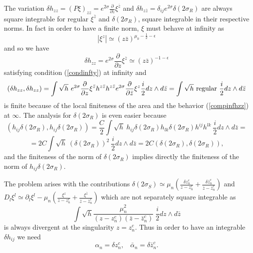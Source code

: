 \documentclass[a4paper,12pt]{article}
\begin{document}
The variation $\delta 
h_{zz}=(P\xi)_{zz}=e^{2\sigma}\frac{\partial}{\partial z}
 \xi^{\bar
z}$ and $\delta h_{z\bar z} = \delta_{ij}
e^{2\sigma}\delta(2\sigma_R)$ are always square integrable for regular
$\xi^{\bar z}$ and $\delta(2\sigma_R)$, square integrable 
in their respective norms. In fact in order to have a finite norm, $\xi$
must behave at infinity as
\begin{equation} 
|\xi^{z}|\simeq(z\bar z)^{\mu_0-\frac{1}{2}-\epsilon}
\end{equation}
and so we have
\begin{equation}\label{compinfhzz}
\delta h_{zz} = e^{2\sigma}\frac{\partial}{\partial z} \xi^{\bar z} \simeq
(z\bar z)^{-1-\epsilon}
\end{equation}
satisfying  condition (\ref{condinfty}) at infinity and
\begin{equation}
(\delta h_{zz}, \delta h_{zz}) = 
\int \sqrt h~ e^{2\sigma}\frac{\partial}{\partial z} \xi^{\bar z}
h^{z\bar z} h^{z\bar z}
e^{2\sigma}\frac{\partial}{\partial \bar z} \xi^z \frac{i}{2}dz\wedge
d\bar z= 
\int \sqrt h ~{\rm regular}~ \frac{i}{2}dz\wedge d\bar z
\end{equation} 
is finite  because of the local finiteness of the area and
the behavior (\ref{compinfhzz}) at $\infty$. 
The analysis for $\delta (2\sigma_R)$ is even easier because 
$$
(h_{ij}\delta(2\sigma_R), h_{ij}\delta(2\sigma_R)) = 
\frac{C}{2}\int \sqrt h
~h_{ij}\delta(2\sigma_R) h_{lk}\delta(2\sigma_R) h^{ij}h^{lk}~
\frac{i}{2}dz\wedge d\bar z =  
$$
\begin{equation}
=2C\int \sqrt h~(\delta(2\sigma_R))^2 ~\frac{i}{2}dz\wedge d\bar z=
2C(\delta(2\sigma_R), 
\delta(2\sigma_R) ),
\end{equation}
and the finiteness of the norm of $\delta(2\sigma_R)$ implies directly
the finiteness of the norm of $h_{ij}\delta(2\sigma_R)$.

The problem arises with the contributions
$\delta (2 \sigma_S)\simeq \mu_n(\frac{\delta z^c_n}{z-z^c_n}+
\frac{\delta \bar z^c_n}{\bar z-\bar z^c_n})$ and $D_l\xi^l \simeq 
\partial_l\xi^l-\mu_n\left(\frac{\xi^z}{z-z^c_n}+\frac{\xi^{\bar z}}
{\bar z-\bar z^c_n}\right) $ which are not separately square integrable
as 
\begin{equation}
\int \sqrt h \frac{\mu_n^2}{(z-z^c_n)(\bar z -\bar
z^c_n)}~\frac{i}{2}dz\wedge d\bar z 
\end{equation}
is always divergent at the singularity $z=z^c_n$.
Thus in order to have an integrable $\delta h_{ij}$ we need
\begin{equation}
\alpha_n = \delta z^c_n,~~~~\bar\alpha_n = \delta \bar z^c_n.
\end{equation}
\end{document}
